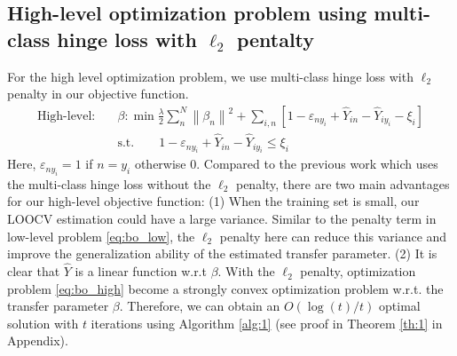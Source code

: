 \subsection{High-level optimization problem using multi-class hinge loss with $\ell_2$ pentalty} 
For the high level optimization problem, we use multi-class hinge loss \cite{crammer2002algorithmic} with $\ell_2$ penalty in our objective function.
\begin{equation}\label{eq:bo_high}
\begin{aligned}
\text{High-level:}\quad&\beta: \min \frac{{{\lambda}}}{2}\sum\limits_{n}^N {{{\left\| {{\beta _n}} \right\|}^2}}  + \sum\limits_{i,n}\left[ {1 - {\varepsilon _{n{y_i}}} + {{\hat Y}_{in}} - {{\hat Y}_{i{y_i}}} - {\xi _i}} \right]\\
&\text{s.t.} \qquad1 - {\varepsilon _{n{y_i}}} + {\hat Y_{in}} - {\hat Y_{i{y_i}}} \le {\xi_i}
\end{aligned}
\end{equation}
Here, $\varepsilon _{n{y_i}}=1$ if $n=y_i$ otherwise 0.
Compared to the previous work \cite{kuzborskij2013n,tommasi2014learning} which uses the multi-class hinge loss without the $\ell_2$ penalty, there are two main advantages for our high-level objective function: (1) When the training set is small, our LOOCV estimation could have a large variance. Similar to the penalty term in low-level problem \eqref{eq:bo_low},  the $\ell_2$ penalty here can {reduce this variance and improve the generalization ability of the estimated transfer parameter}. (2) It is clear that $\hat{Y}$ is a linear function w.r.t $\beta$. With the $\ell_2$ penalty, optimization problem \eqref{eq:bo_high} become a strongly convex optimization problem w.r.t. the transfer parameter $\beta$. Therefore, we can obtain an $O({\log(t)}/{t})$ optimal solution with $t$ iterations using Algorithm \ref{alg:1} (see proof in Theorem \ref{th:1} in Appendix).
 